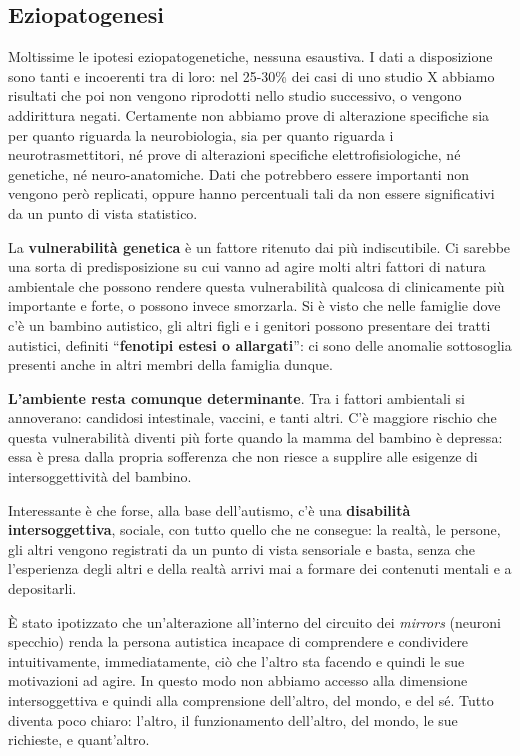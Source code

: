 \subsection{Eziopatogenesi}

Moltissime le ipotesi eziopatogenetiche, nessuna esaustiva. I dati a
disposizione sono tanti e incoerenti tra di loro: nel 25-30\% dei casi
di uno studio X abbiamo risultati che poi non vengono riprodotti nello
studio successivo, o vengono addirittura negati. Certamente non abbiamo
prove di alterazione specifiche sia per quanto riguarda la
neurobiologia, sia per quanto riguarda i neurotrasmettitori, né prove di
alterazioni specifiche elettrofisiologiche, né genetiche, né
neuro-anatomiche. Dati che potrebbero essere importanti non vengono però
replicati, oppure hanno percentuali tali da non essere significativi da
un punto di vista statistico.

La \textbf{vulnerabilità genetica} è un fattore ritenuto dai più
indiscutibile. Ci sarebbe una sorta di predisposizione su cui vanno ad
agire molti altri fattori di natura ambientale che possono rendere
questa vulnerabilità qualcosa di clinicamente più importante e forte, o
possono invece smorzarla. Si è visto che nelle famiglie dove c'è un
bambino autistico, gli altri figli e i genitori possono presentare dei
tratti autistici, definiti ``\textbf{fenotipi estesi o allargati}'': ci
sono delle anomalie sottosoglia presenti anche in altri membri della
famiglia dunque.

\textbf{L'ambiente resta comunque determinante}. Tra i fattori
ambientali si annoverano: candidosi intestinale, vaccini, e tanti altri.
C'è maggiore rischio che questa vulnerabilità diventi più forte quando
la mamma del bambino è depressa: essa è presa dalla propria sofferenza
che non riesce a supplire alle esigenze di intersoggettività del
bambino.

Interessante è che forse, alla base dell'autismo, c'è una
\textbf{disabilità intersoggettiva}, sociale, con tutto quello che ne
consegue: la realtà, le persone, gli altri vengono registrati da un
punto di vista sensoriale e basta, senza che l'esperienza degli altri e
della realtà arrivi mai a formare dei contenuti mentali e a depositarli.

È stato ipotizzato che un'alterazione all'interno del circuito dei
\emph{mirrors} (neuroni specchio) renda la persona autistica incapace di
comprendere e condividere intuitivamente, immediatamente, ciò che
l'altro sta facendo e quindi le sue motivazioni ad agire. In questo modo
non abbiamo accesso alla dimensione intersoggettiva e quindi alla
comprensione dell'altro, del mondo, e del sé. Tutto diventa poco chiaro:
l'altro, il funzionamento dell'altro, del mondo, le sue richieste, e
quant'altro.

